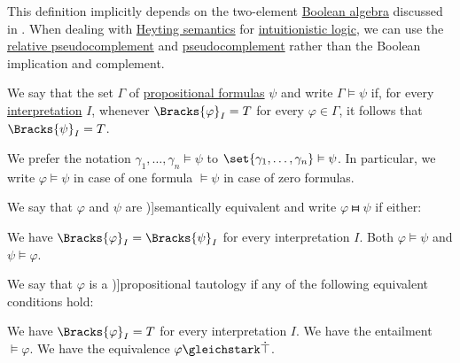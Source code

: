 \begin{comments}
  \item This definition implicitly depends on the two-element \hyperref[def:boolean_algebra]{Boolean algebra} discussed in . When dealing with \hyperref[def:propositional_heyting_algebra_semantics]{Heyting semantics} for \hyperref[rem:intuitionistic_logic]{intuitionistic logic}, we can use the \hyperref[def:heyting_algebra]{relative pseudocomplement} and \hyperref[def:heyting_algebra/pseudocomplement]{pseudocomplement} rather than the Boolean implication and complement.
\end{comments}

\begin{definition}\label{def:propositional_entailment}
  We say that the set \( \Gamma \) of \hyperref[def:propositional_syntax/formula]{propositional formulas}  \( \psi \) and write \( \Gamma \vDash \psi \) if, for every \hyperref[def:propositional_valuation/interpretation]{interpretation} \( I \), whenever \( \Bracks{\varphi}_I = T \) for every \( \varphi \in \Gamma \), it follows that \( \Bracks{\psi}_I = T \).

  We prefer the notation \( \gamma_1, \ldots, \gamma_n \vDash \psi \) to \( \set{ \gamma_1, \ldots, \gamma_n } \vDash \psi \). In particular, we write \( \varphi \vDash \psi \) in case of one formula \( \vDash \psi \) in case of zero formulas.

  \begin{thmenum}
     We say that \( \varphi \) and \( \psi \) are \term[ru=равносильные / эквивалентные (формулы) (\cite[44]{КолмогоровДрагалин2006})]{semantically equivalent} and write \( \varphi \gleichstark \psi \) if either:
    \begin{thmenum}
       We have \( \Bracks{\varphi}_I = \Bracks{\psi}_I \) for every interpretation \( I \).
       Both \( \varphi \vDash \psi \) and \( \psi \vDash \varphi \).
    \end{thmenum}

     We say that \( \varphi \) is a \term[ru=пропозициональная тавтология (\cite[44]{КолмогоровДрагалин2006})]{propositional tautology} if any of the following equivalent conditions hold:
    \begin{thmenum}
       We have \( \Bracks{\varphi}_I = T \) for every interpretation \( I \).
       We have the entailment \( \vDash \varphi \).
       We have the equivalence \( \varphi \gleichstark \syntop \).
    \end{thmenum}


\end{thmenum}
\end{definition}
